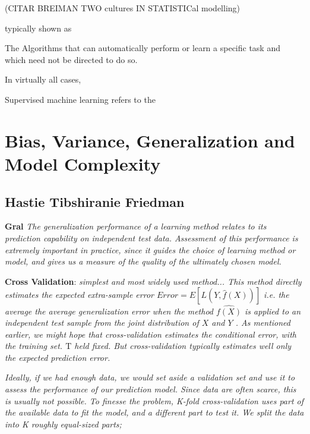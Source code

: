(CITAR BREIMAN TWO cultures IN STATISTICal modelling)

typically shown as 





The 
Algorithms that can automatically perform or learn a specific task and which need not be directed to do so. 



In virtually all cases, 

Supervised machine learning refers to the 


\subsection{}

\section{Bias, Variance, Generalization and Model Complexity}

\subsection{Hastie Tibshiranie Friedman}

\textbf{Gral}
\textit{The generalization performance of a learning method relates to its prediction capability on independent test data. Assessment of this performance is extremely important in practice, since it guides the choice of learning method or model, and gives us a measure of the quality of the ultimately chosen model.}

\textbf{Cross Validation}:  
\textit{simplest and most widely used method... This method directly estimates the expected extra-sample error
$Error = E[L(Y,\hat{f}(X))] $ i.e. the average the average generalization error when the method $\hat{f(X)}$ is applied to an independent test sample from the joint distribution of $X$ and $Y$ . As mentioned earlier, we might hope that cross-validation estimates the conditional error, with the training set. $\mathrm{T}$ held fixed. But cross-validation typically estimates well only the expected prediction error.}

\textit{Ideally, if we had enough data, we would set aside a validation set and use it to assess the performance of our prediction model. Since data are often scarce, this is usually not possible. To finesse the problem, K-fold cross-validation uses part of the available data to fit the model, and a different part to test it. We split the data into K roughly equal-sized parts; }

